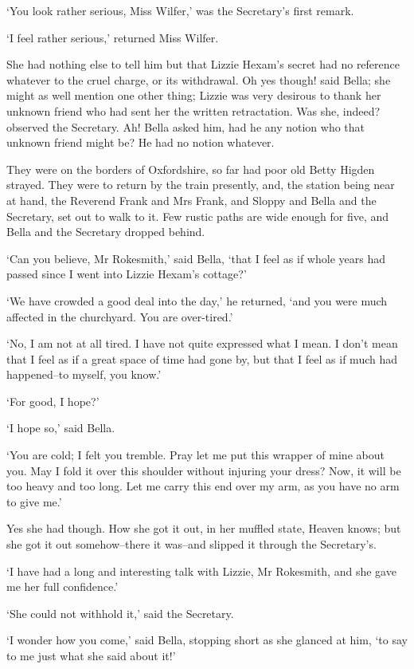 ‘You look rather serious, Miss Wilfer,’ was the Secretary’s first
remark.

‘I feel rather serious,’ returned Miss Wilfer.

She had nothing else to tell him but that Lizzie Hexam’s secret had
no reference whatever to the cruel charge, or its withdrawal. Oh yes
though! said Bella; she might as well mention one other thing; Lizzie
was very desirous to thank her unknown friend who had sent her the
written retractation. Was she, indeed? observed the Secretary. Ah! Bella
asked him, had he any notion who that unknown friend might be? He had no
notion whatever.

They were on the borders of Oxfordshire, so far had poor old Betty
Higden strayed. They were to return by the train presently, and, the
station being near at hand, the Reverend Frank and Mrs Frank, and Sloppy
and Bella and the Secretary, set out to walk to it. Few rustic paths are
wide enough for five, and Bella and the Secretary dropped behind.

‘Can you believe, Mr Rokesmith,’ said Bella, ‘that I feel as if whole
years had passed since I went into Lizzie Hexam’s cottage?’

‘We have crowded a good deal into the day,’ he returned, ‘and you were
much affected in the churchyard. You are over-tired.’

‘No, I am not at all tired. I have not quite expressed what I mean. I
don’t mean that I feel as if a great space of time had gone by, but that
I feel as if much had happened--to myself, you know.’

‘For good, I hope?’

‘I hope so,’ said Bella.

‘You are cold; I felt you tremble. Pray let me put this wrapper of mine
about you. May I fold it over this shoulder without injuring your dress?
Now, it will be too heavy and too long. Let me carry this end over my
arm, as you have no arm to give me.’

Yes she had though. How she got it out, in her muffled state, Heaven
knows; but she got it out somehow--there it was--and slipped it through
the Secretary’s.

‘I have had a long and interesting talk with Lizzie, Mr Rokesmith, and
she gave me her full confidence.’

‘She could not withhold it,’ said the Secretary.

‘I wonder how you come,’ said Bella, stopping short as she glanced at
him, ‘to say to me just what she said about it!’

